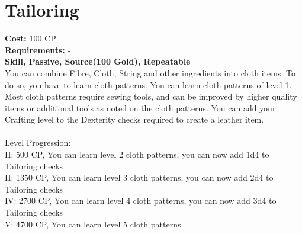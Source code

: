\section{Tailoring}\label{perk:Tailoring}
\textbf{Cost:} 100 CP\\
\textbf{Requirements:} -\\
\textbf{Skill, Passive, Source(100 Gold), Repeatable}\\
You can combine Fibre, Cloth, String and other ingredients into cloth items.
To do so, you have to learn cloth patterns.
You can learn cloth patterns of level 1.
Most cloth patterns require sewing tools, and can be improved by higher quality items or additional tools as noted on the cloth patterns.
You can add your Crafting level to the Dexterity checks required to create a leather item.\\
\\
Level Progression:\\
II: 500 CP, You can learn level 2 cloth patterns, you can now add 1d4 to Tailoring checks\\
II: 1350 CP, You can learn level 3 cloth patterns, you can now add 2d4 to Tailoring checks\\
IV: 2700 CP, You can learn level 4 cloth patterns, you can now add 3d4 to Tailoring checks\\
V: 4700 CP, You can learn level 5 cloth patterns.\\